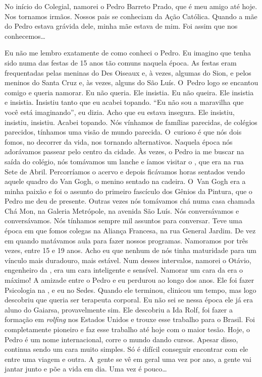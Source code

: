 No início do Colegial, namorei o Pedro Barreto Prado, que é meu amigo
até hoje. Nos tornamos irmãos. Nossos pais se conheciam da Ação
Católica. Quando a mãe do Pedro estava grávida dele, minha mãe estava de
mim. Foi assim que nos conhecemos…

Eu não me lembro exatamente de como conheci o Pedro. Eu imagino que
tenha sido numa das festas de 15 anos tão comuns naquela época. As
festas eram frequentadas pelas meninas do Des Oiseaux e, à vezes,
algumas do Sion, e pelos meninos do Santa Cruz e, às vezes, alguns do
São Luís. O~Pedro logo se encantou comigo e queria namorar. Eu não
queria. Ele insistia. Eu não queira. Ele insistia e insistia. Insistiu
tanto que eu acabei topando. ``Eu não sou a maravilha que você está
imaginando'', eu dizia. Acho que eu estava insegura. Ele insistiu,
insistiu, insistiu. Acabei topando. Nós vínhamos de famílias parecidas,
de colégios parecidos, tínhamos uma visão de mundo parecida. O~curioso é
que nós dois fomos, no decorrer da vida, nos tornando alternativos.
Naquela época nós adorávamos passear pelo centro da cidade. Às vezes, o
Pedro ia me buscar na saída do colégio, nós tomávamos um lanche e íamos
visitar o , que era na rua Sete de Abril. Percorríamos o acervo e
depois ficávamos horas sentados vendo aquele quadro do Van Gogh, o
menino sentado na cadeira. O~Van Gogh era a minha paixão e foi o assunto
do primeiro fascículo dos Gênios da Pintura, que o Pedro me deu de
presente. Outras vezes nós tomávamos chá numa casa chamada Chá Mon, na
Galeria Metrópole, na avenida São Luís. Nós conversávamos e
conversávamos. Nós tínhamos sempre mil assuntos para conversar. Teve uma
época em que fomos colegas na Aliança Francesa, na rua General Jardim.
De vez em quando matávamos aula para fazer nossos programas. Namoramos
por três vezes, entre 15 e 19 anos. Acho eu que nenhum de nós tinha
maturidade para um vínculo mais duradouro, mais estável. Num desses
intervalos, namorei o Otávio, engenheiro da , era um cara
inteligente e sensível. Namorar um cara da  era o máximo! A amizade
entre o Pedro e eu perdurou ao longo dos anos. Ele foi fazer Psicologia
na , e eu no Sedes. Quando ele terminou, clinicou um tempo, mas logo
descobriu que queria ser terapeuta corporal. Eu não sei se nessa época
ele já era aluno do Gaiarsa, provavelmente sim. Ele descobriu a Ida
Rolf, foi fazer a formação em \emph{rolfing} nos Estados Unidos e trouxe
esse trabalho para o Brasil. Foi completamente pioneiro e faz esse
trabalho até hoje com o maior tesão. Hoje, o Pedro é um nome
internacional, corre o mundo dando cursos. Apesar disso, continua sendo
um cara muito simples. Só é difícil conseguir encontrar com ele entre
uma viagem e outra. A~gente se vê em geral uma vez por ano, a gente vai
jantar junto e põe a vida em dia. Uma vez é pouco…

